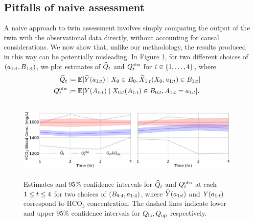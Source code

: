 \subsection{Pitfalls of naive assessment}

A naive approach to twin assessment involves simply comparing the output of the twin with the observational data directly, without accounting for causal considerations.
We now show that, unlike our methodology, the results produced in this way can be potentially misleading.
In Figure \ref{fig:longitudinal_plots}, for two different choices of $(a_{1:4}, B_{1:4})$, we plot estimates of $\widehat{Q}_t$ and $Q^{\textup{obs}}_t$ for $t \in \{1, \ldots, 4\}$, where
\begin{align*}
    \widehat{Q}_t &\coloneqq \mathbb{E}[\widehat{Y}(a_{1:t})\mid X_0 \in B_0, \widehat{X}_{1:t}(X_0, a_{1:t}) \in B_{1:t}] \\
    Q^{\textup{obs}}_t &\coloneqq \mathbb{E}[Y(A_{1:t})\mid X_{0:t}(A_{1:t})\in B_{0:t}, A_{1:t}=a_{1:t}].
\end{align*}
\begin{figure}%
    \centering
    \includegraphics[height=4cm]{figures/causal/longitudinal_plots/HCO3_hyp_38v37_longitudinal_nogray.pdf}
    \caption{Estimates and 95\% confidence intervals for $\widehat{Q}_t$ and $Q^{\textup{obs}}_t$ at each $1\leq t \leq 4$ for two choices of $(B_{0:4}, a_{1:4})$, where $\widehat{Y}(a_{1:t})$ and $Y(a_{1:t})$ correspond to HCO$_3$ concentration.
    The dashed lines indicate lower and upper 95\% confidence intervals for $Q_{\mathrm{lo}}, Q_{\mathrm{up}}$ respectively.  }
    \label{fig:longitudinal_plots}
\end{figure}
